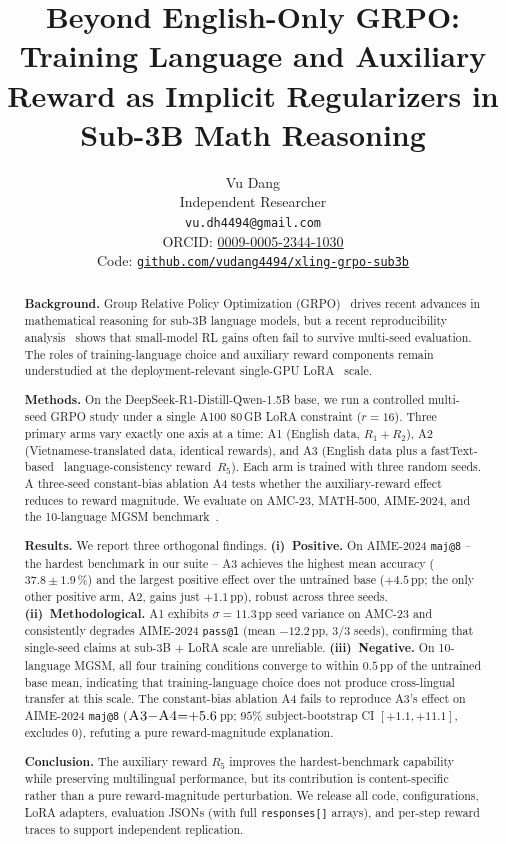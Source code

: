 \documentclass[11pt]{article}
\title{Beyond English-Only GRPO: Training Language and Auxiliary Reward
       as Implicit Regularizers in Sub-3B Math Reasoning}
\author{Vu Dang \\
  Independent Researcher \\
  \texttt{vu.dh4494@gmail.com} \\
  ORCID: \href{https://orcid.org/0009-0005-2344-1030}{0009-0005-2344-1030} \\
  Code: \href{https://github.com/vudang4494/xling-grpo-sub3b}%
             {\nolinkurl{github.com/vudang4494/xling-grpo-sub3b}}}
\newcommand{\armA}{\textsc{A1}}
\newcommand{\armB}{\textsc{A2}}
\newcommand{\armC}{\textsc{A3}}
\newcommand{\armD}{\textsc{A4}}
\begin{document}
\maketitle

\begin{abstract}
\noindent\textbf{Background.}
Group Relative Policy Optimization
(GRPO)~\cite{deepseekmath_2024,deepseekR1_2025} drives recent advances in
mathematical reasoning for sub-3B language models, but a recent
reproducibility analysis~\cite{sober_look_2025} shows that small-model RL
gains often fail to survive multi-seed evaluation. The roles of
training-language choice and auxiliary reward components remain
understudied at the deployment-relevant single-GPU
LoRA~\cite{hu2022lora} scale.

\noindent\textbf{Methods.}
On the DeepSeek-R1-Distill-Qwen-1.5B base, we run a controlled multi-seed
GRPO study under a single A100 80\,GB LoRA constraint ($r{=}16$). Three
primary arms vary exactly one axis at a time: \armA{} (English data,
$R_1{+}R_2$), \armB{} (Vietnamese-translated data, identical rewards),
and \armC{} (English data plus a fastText-based~\cite{joulin2017fasttext}
language-consistency reward~$R_5$). Each arm is trained with three random
seeds. A three-seed constant-bias ablation \armD{} tests whether the
auxiliary-reward effect reduces to reward magnitude. We evaluate on
AMC-23, MATH-500, AIME-2024, and the 10-language MGSM
benchmark~\cite{mgsm_2022}.

\noindent\textbf{Results.}
We report three orthogonal findings.
\textbf{(i)~Positive.} On AIME-2024 \texttt{maj@8} -- the hardest benchmark
in our suite -- \armC{} achieves the highest mean accuracy
($37.8 \pm 1.9$\,\%) and the largest positive effect over the untrained
base ($+4.5$\,pp; the only other positive arm, \armB{}, gains just
$+1.1$\,pp), robust across three seeds.
\textbf{(ii)~Methodological.} \armA{} exhibits $\sigma{=}11.3$\,pp seed
variance on AMC-23 and consistently degrades AIME-2024 \texttt{pass@1}
(mean $-12.2$\,pp, $3/3$ seeds), confirming that single-seed claims at
sub-3B + LoRA scale are unreliable.
\textbf{(iii)~Negative.} On 10-language MGSM, all four training
conditions converge to within $0.5$\,pp of the untrained base mean,
indicating that training-language choice does not produce cross-lingual
transfer at this scale. The constant-bias ablation \armD{} fails to
reproduce \armC{}'s effect on AIME-2024 \texttt{maj@8}
($\armC{}{-}\armD{}{=}{+}5.6$\,pp; $95\%$ subject-bootstrap CI $[+1.1, +11.1]$, excludes $0$), refuting a pure reward-magnitude
explanation.

\noindent\textbf{Conclusion.}
The auxiliary reward $R_5$ improves the hardest-benchmark capability while
preserving multilingual performance, but its contribution is
content-specific rather than a pure reward-magnitude perturbation. We
release all code, configurations, LoRA adapters, evaluation JSONs (with
full \texttt{responses[]} arrays), and per-step reward traces to support
independent replication.
\end{abstract}
\end{document}
